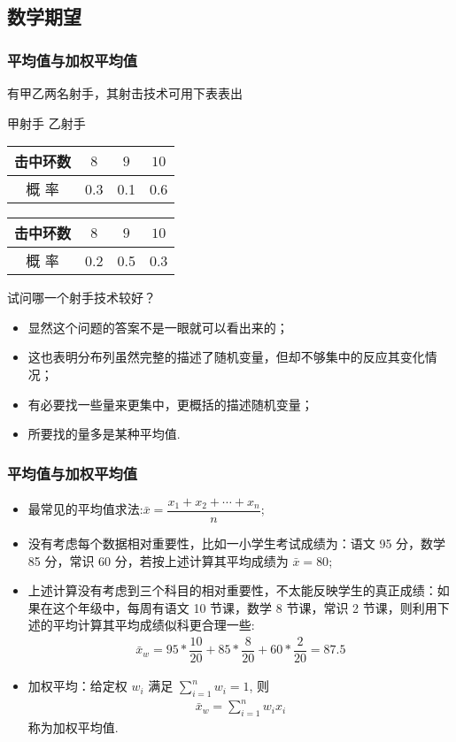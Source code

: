 \subsection{数学期望}
\begin{frame}
	\frametitle{平均值与加权平均值}
	有甲乙两名射手，其射击技术可用下表表出 \begin{table}
		甲射手 \qquad \qquad\qquad \qquad \qquad \qquad 乙射手 \\
		\vspace{0.4cm}
		\begin{tabular}{c|c|c|c}
			\hline
			\rowcolor{blue!50}
			击中环数  &$8$ & $9$&$10$\\
			\hline
			概 \quad 率 & 0.3 & 0.1  & 0.6 \\
			\hline
		\end{tabular}
		\begin{tabular}{c|c|c|c}
			\hline
			\rowcolor{blue!50}
			击中环数  &$8$ & $9$&$10$\\
			\hline
			概 \quad 率 & 0.2 & 0.5  & 0.3 \\
			\hline
		\end{tabular}
	\end{table}
	试问哪一个射手技术较好？

	\pause
	\begin{itemize}[<+-|alert@+>]
		\item 显然这个问题的答案不是一眼就可以看出来的；
		\item 这也表明分布列虽然完整的描述了随机变量，但却不够集中的反应其变化情况；
		\item 有必要找一些量来更集中，更概括的描述随机变量；
		\item 所要找的量多是某种平均值.
	\end{itemize}
\end{frame}

\begin{frame}
	\frametitle{平均值与加权平均值}
	\begin{itemize}[<+-|alert@+>]
		\item 最常见的平均值求法:$\bar{x}=\dfrac{x_1+x_2+\cdots+x_n}{n}$;
		\item 没有考虑每个数据相对重要性，比如一小学生考试成绩为：语文 95 分，数学 85 分，常识 60 分，若按上述计算其平均成绩为 $\bar{x}=80$;
		\item 上述计算没有考虑到三个科目的相对重要性，不太能反映学生的真正成绩：如果在这个年级中，每周有语文 10 节课，数学 8 节课，常识 2 节课，则利用下述的平均计算其平均成绩似科更合理一些:
		\begin{eqnarray*}
			\bar{x}_w=95*\dfrac{10}{20}+85*\dfrac{8}{20}+60*\dfrac{2}{20}=87.5
		\end{eqnarray*}
		\item 加权平均：给定权 $w_i$ 满足 $\sum_{i=1}^nw_i=1$, 则
		\begin{eqnarray*}
			\bar{x}_w=\sum_{i=1}^nw_ix_i
		\end{eqnarray*}
		称为加权平均值.
	\end{itemize}
\end{frame}

